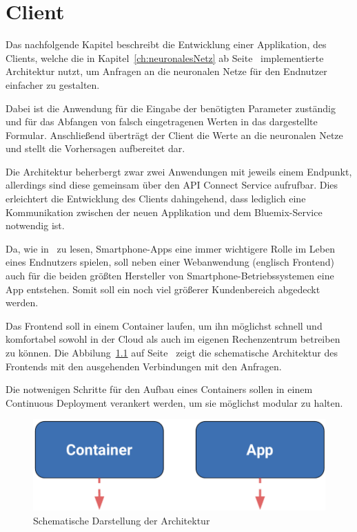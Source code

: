 \chapter{Client}
\label{ch:client}
Das nachfolgende Kapitel beschreibt die Entwicklung einer Applikation, des Clients, welche die in
Kapitel~\ref{ch:neuronalesNetz} ab Seite~\pageref{ch:neuronalesNetz} implementierte Architektur nutzt, um Anfragen an
die neuronalen Netze für den Endnutzer einfacher zu gestalten.

Dabei ist die Anwendung für die Eingabe der benötigten Parameter zuständig und für das Abfangen von falsch eingetragenen
Werten in das dargestellte Formular. Anschließend überträgt der Client die Werte an die neuronalen Netze und stellt die
Vorhersagen aufbereitet dar.

Die Architektur beherbergt zwar zwei Anwendungen mit jeweils einem Endpunkt, allerdings sind diese gemeinsam über
den API Connect Service aufrufbar. Dies erleichtert die Entwicklung des Clients dahingehend, dass lediglich eine
Kommunikation zwischen der neuen Applikation und dem Bluemix-Service notwendig ist.

Da, wie in~\cite{online_client_apps} zu lesen, Smartphone-Apps eine immer wichtigere Rolle im Leben eines Endnutzers
spielen, soll neben einer Webanwendung (englisch Frontend) auch für die beiden größten Hersteller von
Smartphone-Betriebssystemen eine App entstehen. Somit soll ein noch viel größerer Kundenbereich abgedeckt werden.

Das Frontend soll in einem Container laufen, um ihn möglichst schnell und komfortabel sowohl in der Cloud als auch
im eigenen Rechenzentrum betreiben zu können. Die Abbilung~\ref{fig:schematische_architektur_4} auf
Seite~\pageref{fig:schematische_architektur_4} zeigt die schematische Architektur des Frontends mit den ausgehenden
Verbindungen mit den Anfragen.

Die notwenigen Schritte für den Aufbau eines Containers sollen in einem Continuous Deployment verankert werden, um sie
möglichst modular zu halten.

\begin{figure}[h]
    \centering
    \includegraphics[scale=0.5]{images/kapitel_4/architektur_schematisch.pdf}
    \caption{Schematische Darstellung der Architektur}
    \label{fig:schematische_architektur_4}
\end{figure}
